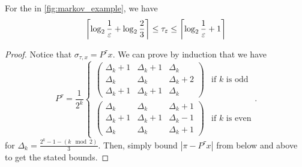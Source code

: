 \begin{examplesketch}
  For the \markov in \cref{fig:markov_example}, we have \[
    \left\lceil \log_2{\frac{1}{\varepsilon}} + \log_2{\frac{2}{3}}\right\rceil \leq \tau_{\varepsilon} \leq \left\lceil \log_2{\frac{1}{\varepsilon}} + 1\right\rceil
  \]
\end{examplesketch}
\begin{proof}
  Notice that $\sigma_{\tau, x} = P^{\tau}x$.
  We can prove by induction that we have \[
    P^{\tau} = \frac{1}{2^k}\begin{cases}
      \left(\begin{array}{ccc}
        \Delta_k + 1 & \Delta_k + 1 & \Delta_k \\
        \Delta_k & \Delta_k & \Delta_k + 2 \\
        \Delta_k + 1 & \Delta_k + 1 & \Delta_k
    \end{array}\right) & \text{if $k$ is odd} \\
    \left(\begin{array}{ccc}
        \Delta_k & \Delta_k & \Delta_k + 1 \\
        \Delta_k + 1 & \Delta_k + 1 & \Delta_k - 1 \\
        \Delta_k & \Delta_k & \Delta_k + 1 
    \end{array}\right) & \text{if $k$ is even}
    \end{cases}.
  \] for $\Delta_k = \frac{2^k - 1 - \left(k \mod 2\right)}{3}$.
  Then, simply bound $|\pi - P^{\tau}x|$ from below and above to get the stated bounds.
\end{proof}
